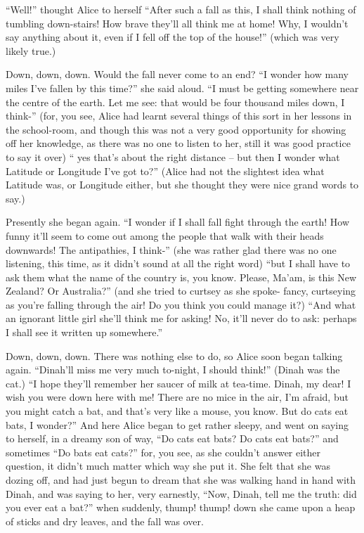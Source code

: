 \documentclass{l3proj}
\begin{document}
``Well!'' thought Alice to herself ``After such a fall as this, I shall think
nothing of tumbling down-stairs! How brave they'll all think me at home!
Why, I wouldn't say anything about it, even if I fell off the top of the
house!'' (which was very likely true.)

Down, down, down. Would the fall never come to an end? ``I wonder how many
miles I've fallen by this time?'' she said aloud. ``I must be getting
somewhere near the centre of the earth. Let me see: that would be four
thousand miles down, I think-'' (for, you see, Alice had learnt several
things of this sort in her lessons in the school-room, and though this was
not a very good opportunity for showing off her knowledge, as there was no
one to listen to her, still it was good practice to say it over) `` yes
that's about the right distance -- but then I wonder what Latitude or
Longitude I've got to?'' (Alice had not the slightest idea what Latitude
was, or Longitude either, but she thought they were nice grand words to
say.)

Presently she began again. ``I wonder if I shall fall fight through the
earth! How funny it'll seem to come out among the people that walk with
their heads downwards! The antipathies, I think-'' (she was rather glad
there was no one listening, this time, as it didn't sound at all the right
word) ``but I shall have to ask them what the name of the country is, you
know. Please, Ma'am, is this New Zealand? Or Australia?'' (and she tried to
curtsey as she spoke- fancy, curtseying as you're falling through the air!
Do you think you could manage it?) ``And what an ignorant little girl she'll
think me for asking! No, it'll never do to ask: perhaps I shall see it
written up somewhere.''

Down, down, down. There was nothing else to do, so Alice soon began talking
again. ``Dinah'll miss me very much to-night, I should think!'' (Dinah was
the cat.) ``I hope they'll remember her saucer of milk at tea-time. Dinah,
my dear! I wish you were down here with me! There are no mice in the air,
I'm afraid, but you might catch a bat, and that's very like a mouse, you
know. But do cats eat bats, I wonder?'' And here Alice began to get rather
sleepy, and went on saying to herself, in a dreamy son of way, ``Do cats eat
bats? Do cats eat bats?'' and sometimes ``Do bats eat cats?'' for, you see, as
she couldn't answer either question, it didn't much matter which way she
put it. She felt that she was dozing off, and had just begun to dream that
she was walking hand in hand with Dinah, and was saying to her, very
earnestly, ``Now, Dinah, tell me the truth: did you ever eat a bat?'' when
suddenly, thump! thump! down she came upon a heap of sticks and dry leaves,
and the fall was over.
\end{document}
